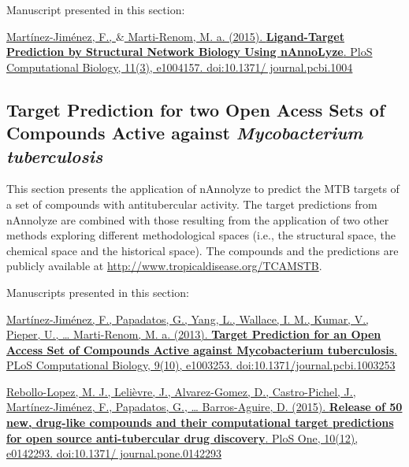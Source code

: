 \documentclass[11pt, b5paper,twoside]{tesi_upf}
\begin{document}
\par Manuscript presented in this section: 
\begin{tcolorbox}

\href{http://journals.plos.org/ploscompbiol/article?id=10.1371\%2Fjournal.pcbi.1004157}{Martínez-Jiménez, F., $\&$ Marti-Renom, M. a. (2015). \textbf{Ligand-Target Prediction by Structural Network Biology Using nAnnoLyze}. PloS Computational Biology, 11(3), e1004157. doi:10.1371/ journal.pcbi.1004}

\end{tcolorbox}


\clearpage

 



\subsection{Target Prediction for two Open Acess Sets of Compounds Active against \textit{Mycobacterium tuberculosis}}\label{mtb_results}

\par This section presents the application of nAnnolyze to predict the MTB targets of a set of compounds with antitubercular activity. The target predictions from nAnnolyze are combined with those resulting from the application of two other methods exploring different methodological spaces (i.e., the structural space, the chemical space and the historical space). The compounds and the predictions are publicly available at \url{http://www.tropicaldisease.org/TCAMSTB}. \hfill

Manuscripts presented in this section:
\vspace*{10mm}
 \begin{tcolorbox}

\href{http://journals.plos.org/ploscompbiol/article?id=10.1371\%2Fjournal.pcbi.1003253}{Martínez-Jiménez, F., Papadatos, G., Yang, L., Wallace, I. M., Kumar, V., Pieper, U., … Marti-Renom, M. a. (2013). \textbf{Target Prediction for an Open Access Set of Compounds Active against Mycobacterium tuberculosis}. PLoS Computational Biology, 9(10), e1003253. doi:10.1371/journal.pcbi.1003253}
\hfill
\vspace*{7mm}

\href{http://journals.plos.org/plosone/article?id=10.1371/journal.pone.0142293}{Rebollo-Lopez, M. J., Lelièvre, J., Alvarez-Gomez, D., Castro-Pichel, J., Martínez-Jiménez, F., Papadatos, G., … Barros-Aguire, D. (2015). \textbf{Release of 50 new, drug-like compounds and their computational target predictions for open source anti-tubercular drug discovery}. PloS One, 10(12), e0142293. doi:10.1371/ journal.pone.0142293}

\end{tcolorbox}
\end{document}
